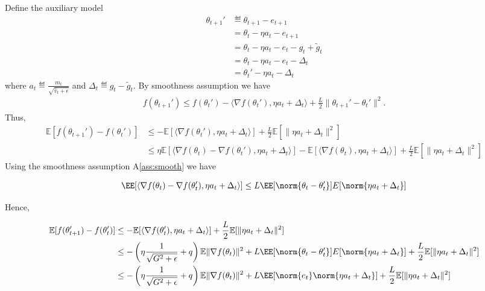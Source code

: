 \documentclass[11pt]{article}
\begin{document}
Define the auxiliary model
\begin{align*}
\theta_{t+1}'&\eqdef \theta_{t+1}- e_{t+1}\\
&=\theta_t - \eta a_t- e_{t+1}\\
& =\theta_t - \eta a_t- e_{t} - g_t + \tilde g_t\\ 
& =\theta_t - \eta a_t- e_{t} - \Delta_t\\
& =\theta_t' - \eta a_t - \Delta_t
\end{align*}
where $a_t \eqdef \frac{m_t}{\sqrt{\hat v_t+\epsilon}}$ and $\Delta_t \eqdef g_t - \tilde g_t$.
By smoothness assumption we have
\begin{align*}
    f(\theta_{t+1}')\leq f(\theta_t')-\langle \nabla f(\theta_t'), \eta a_t + \Delta_t \rangle+\frac{L}{2}\| \theta_{t+1}'-\theta_t'\|^2.
\end{align*}
Thus,
\begin{align*}
    \mathbb E[f(\theta_{t+1}')-f(\theta_t')]&\leq -\mathbb E[\langle \nabla f(\theta_t'), \eta a_t + \Delta_t \rangle]+\frac{L}{2}\mathbb E[\|\eta a_t + \Delta_t\|^2]\\
        & \leq \eta\mathbb E[\langle \nabla f(\theta_t) -  \nabla f(\theta_t') , \eta a_t + \Delta_t \rangle] -\mathbb E[\langle  \nabla f(\theta_t), \eta  a_t + \Delta_t \rangle] +\frac{L}{2}\mathbb E[\|\eta a_t + \Delta_t\|^2]
\end{align*}
Using the smoothness assumption A\ref{ass:smooth} we have 

\begin{align*}
\EE[\langle \nabla f(\theta_t) -  \nabla f(\theta_t') , \eta a_t + \Delta_t \rangle] \leq L \EE[\norm{\theta_t - \theta_t'}] E[\norm{\eta a_t + \Delta_t}]
\end{align*}

Hence,

\begin{align*}
    \mathbb E[f(\theta_{t+1}')-f(\theta_t')]&\leq -\mathbb E[\langle \nabla f(\theta_t'), \eta a_t + \Delta_t \rangle]+\frac{L}{2}\mathbb E[\|\eta a_t + \Delta_t\|^2]\\
        & \leq - \left( \eta\frac{1}{\sqrt{G^2+\epsilon}} + q \right) \mathbb E\|\nabla f(\theta_t)\|^2 + L \EE[\norm{\theta_t - \theta_t'}] E[\norm{\eta a_t + \Delta_t}]+\frac{L}{2}\mathbb E[\|\eta a_t + \Delta_t\|^2]\\
                & \leq - \left( \eta\frac{1}{\sqrt{G^2+\epsilon}} + q \right) \mathbb E\|\nabla f(\theta_t)\|^2 + L \EE[\norm{e_t}\norm{\eta a_t + \Delta_t}]+\frac{L}{2}\mathbb E[\|\eta a_t + \Delta_t\|^2]
\end{align*}
\end{document}
